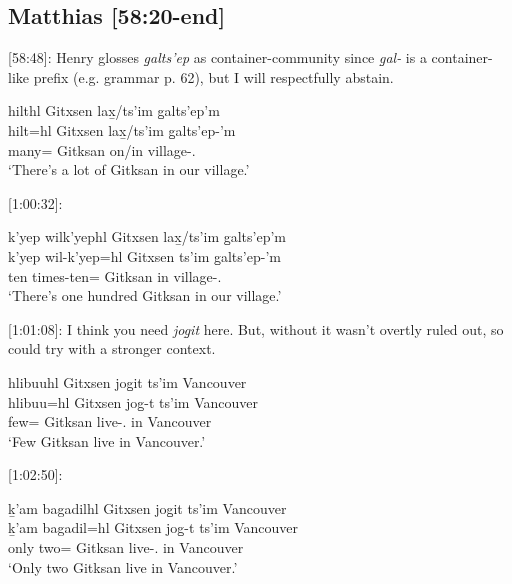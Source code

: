 \subsection{Matthias [58:20-end]}

[58:48]: Henry glosses \textit{g̱alts'ep} as container-community since \textit{g̱al-} is a container-like prefix (e.g. grammar p. 62), but I will respectfully abstain. 

\begin{exe}
    \ex \glll hilthl Gitxsen lax̱/ts'im g̱alts'ep'm \\
    hilt=hl Gitxsen lax̱/ts'im g̱alts'ep-'m \\
    many=\Cn{} Gitksan on/in village-\Fpl{}.\Ii{}  \\
    `There's a lot of Gitksan in our village.'
\end{exe}

[1:00:32]:

\begin{exe}
    \ex \glll k'yep wilk'yephl Gitxsen lax̱/ts'im g̱alts'ep'm \\
    k'yep wil-k'yep=hl Gitxsen ts'im g̱alts'ep-'m \\
    ten times-ten=\Cn{} Gitksan in village-\Fpl{}.\Ii{}  \\
    `There's one hundred Gitksan in our village.'
\end{exe}

[1:01:08]: I think you need \textit{jog̱it} here. But, without it wasn't overtly ruled out, so could try with a stronger context.

\begin{exe}
    \ex \glll hlibuuhl Gitxsen jog̱it ts'im Vancouver \\
    hlibuu=hl Gitxsen jog̱-t ts'im Vancouver \\
    few=\Cn{} Gitksan live-\Tsg{}.\Ii{} in Vancouver  \\
    `Few Gitksan live in Vancouver.'
\end{exe}

[1:02:50]: 

\begin{exe}
    \ex \glll ḵ'am bagadilhl Gitxsen jog̱it ts'im Vancouver \\
    ḵ'am bagadil=hl Gitxsen jog̱-t ts'im Vancouver \\
    only two=\Cn{} Gitksan live-\Tsg{}.\Ii{} in Vancouver  \\
    `Only two Gitksan live in Vancouver.'
\end{exe}

